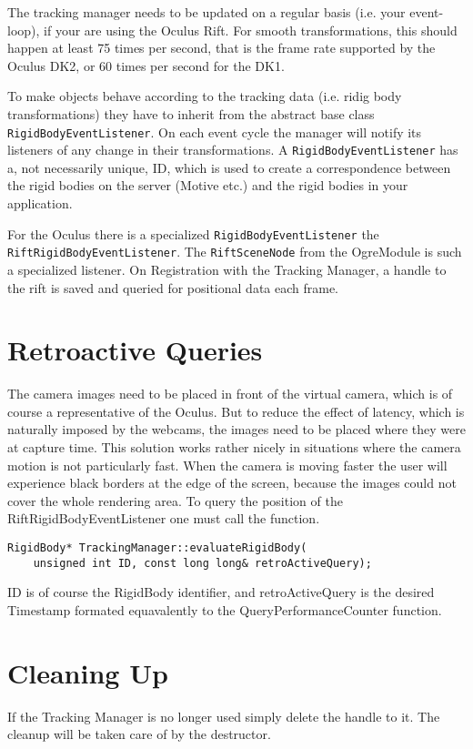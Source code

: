 The tracking manager needs to be updated on a regular basis (i.e. your event-loop), if your are using the Oculus Rift. For smooth transformations, this should happen at least 75 times per second, that is the frame rate supported by the Oculus DK2, or 60 times per second for the DK1.

To make objects behave according to the tracking data (i.e. ridig body transformations) they have to inherit from the abstract base class \texttt{RigidBodyEventListener}. On each event cycle the manager will notify its listeners of any change in their transformations. A \texttt{RigidBodyEventListener} has a, not necessarily unique, ID, which is used to create a correspondence between the rigid bodies on the server (Motive etc.) and the rigid bodies in your application.

For the Oculus there is a specialized \texttt{RigidBodyEventListener} the \texttt{\justify RiftRigidBodyEventListener}. The \texttt{RiftSceneNode} from the OgreModule is such a specialized listener. On Registration with the Tracking Manager, a handle to the rift is saved and queried for positional data each frame.


\section{Retroactive Queries}\label{retroactive-queries}

The camera images need to be placed in front of the virtual camera, which is of course a representative of the Oculus. But to reduce the effect of latency, which is naturally imposed by the webcams, the images need to be placed where they were at capture time. This solution works rather nicely in situations where the camera motion is not particularly fast. When the camera is moving faster the user will experience black borders at the edge of the screen, because the images could not cover the whole rendering area. To query the position of the RiftRigidBodyEventListener one must call the function.

\begin{lstlisting}
RigidBody* TrackingManager::evaluateRigidBody(
    unsigned int ID, const long long& retroActiveQuery);
\end{lstlisting}

ID is of course the RigidBody identifier, and retroActiveQuery is the desired Timestamp formated equavalently to the QueryPerformanceCounter function.

\section{Cleaning Up}\label{cleaning-up}

If the Tracking Manager is no longer used simply delete the handle to it. The cleanup will be taken care of by the destructor.